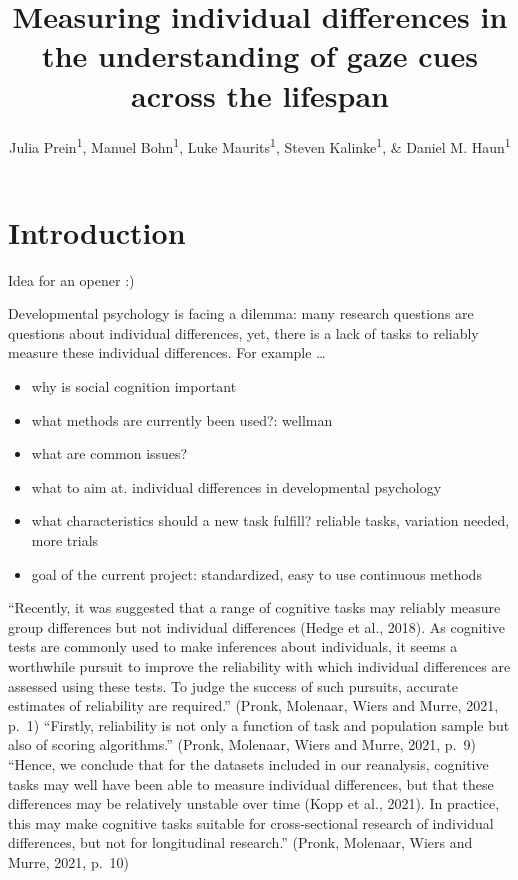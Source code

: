 \documentclass[
  man,floatsintext]{apa6}
\title{Measuring individual differences in the understanding of gaze cues across the lifespan}
\author{Julia Prein\textsuperscript{1}, Manuel Bohn\textsuperscript{1}, Luke Maurits\textsuperscript{1}, Steven Kalinke\textsuperscript{1}, \& Daniel M. Haun\textsuperscript{1}}
\date{}
\affiliation{\vspace{0.5cm}\textsuperscript{1} Department of Comparative Cultural Psychology, Max Planck Institute for Evolutionary Anthropology, Leipzig, Germany}
\providecommand{\tightlist}{%
  \setlength{\itemsep}{0pt}\setlength{\parskip}{0pt}}
\begin{document}
\maketitle

\hypertarget{introduction}{%
\section{Introduction}\label{introduction}}

Idea for an opener :)

Developmental psychology is facing a dilemma: many research questions are questions about individual differences, yet, there is a lack of tasks to reliably measure these individual differences. For example \ldots{}

\begin{itemize}
\tightlist
\item
  why is social cognition important
\item
  what methods are currently been used?: wellman
\item
  what are common issues?
\item
  what to aim at. individual differences in developmental psychology
\item
  what characteristics should a new task fulfill? reliable tasks, variation needed, more trials
\item
  goal of the current project: standardized, easy to use continuous methods
\end{itemize}

``Recently, it was suggested that a range of cognitive tasks may reliably measure group differences but not individual differences (Hedge et al., 2018). As cognitive tests are commonly used to make inferences about individuals, it seems a worthwhile pursuit to improve the reliability with which individual differences are assessed using these tests. To judge the success of such pursuits, accurate estimates of reliability are required.'' (Pronk, Molenaar, Wiers and Murre, 2021, p.~1)
``Firstly, reliability is not only a function of task and population sample but also of scoring algorithms.'' (Pronk, Molenaar, Wiers and Murre, 2021, p.~9)
``Hence, we conclude that for the datasets included in our reanalysis, cognitive tasks may well have been able to measure individual differences, but that these differences may be relatively unstable over time (Kopp et al., 2021). In practice, this may make cognitive tasks suitable for cross-sectional research of individual differences, but not for longitudinal research.'' (Pronk, Molenaar, Wiers and Murre, 2021, p.~10)
\end{document}
